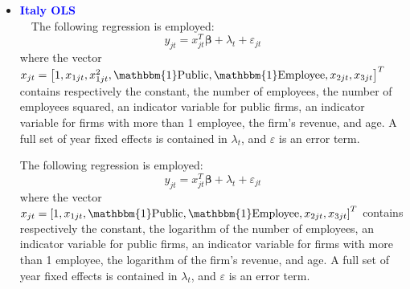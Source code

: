 \documentclass[12pt,notitlepage]{article}
\newcommand{\sym}[1] {\ifmmode^{#1} \else\(^{#1}\) \fi}
\begin{document}
\begin{itemize} %
\item \textcolor{blue}{\textbf{Italy OLS}}\\~\
The following regression is employed:
	\begin{equation}
	y_{jt} = x^{T}_{jt}\mathbf{\beta} + \lambda_{t} + \varepsilon_{jt}
	\end{equation}
where the vector $x_{jt} = \left[  1, x_{1jt}, x^{2}_{1jt}, \mathbbm{1}\text{Public}, \mathbbm{1}\text{Employee}, x_{2jt}, x_{3jt}  \right]^{T} $ contains respectively the constant, the number of employees, the number of employees squared, an indicator variable for public firms, an indicator variable for firms with more than 1 employee, the firm's revenue, and age. A full set of year fixed effects is contained in $\lambda_{t}$, and $\varepsilon$ is an error term.

\begin{table}[htbp]\centering
\def\sym#1{\ifmmode^{#1}\else\(^{#1}\)\fi}
\caption{Haltiwanger growth rate}
\end{table}

\clearpage
The following regression is employed:
	\begin{equation}
	y_{jt} = x^{T}_{jt}\mathbf{\beta} + \lambda_{t} + \varepsilon_{jt}
	\end{equation}
where the vector $x_{jt} = \left[  1, x_{1jt}, \mathbbm{1}\text{Public}, \mathbbm{1}\text{Employee}, x_{2jt}, x_{3jt}  \right]^{T} $ contains respectively the constant, the logarithm of the number of employees, an indicator variable for public firms, an indicator variable for firms with more than 1 employee, the logarithm of the firm's revenue, and age. A full set of year fixed effects is contained in $\lambda_{t}$, and $\varepsilon$ is an error term.
\begin{table}[htbp]\centering
\def\sym#1{\ifmmode^{#1}\else\(^{#1}\)\fi}
\caption{Haltiwanger growth rate}
\end{table}


\end{itemize}
\end{document}
